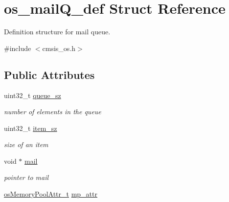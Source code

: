 \hypertarget{structos__mail_q__def}{}\section{os\+\_\+mail\+Q\+\_\+def Struct Reference}
\label{structos__mail_q__def}


Definition structure for mail queue.  




{\ttfamily \#include $<$cmsis\+\_\+os.\+h$>$}

\subsection*{Public Attributes}
\begin{DoxyCompactItemize}
\item 
\mbox{\label{structos__mail_q__def_a2614df3d7904500621666abc01808f22}} 
uint32\+\_\+t \mbox{\hyperlink{structos__mail_q__def_a2614df3d7904500621666abc01808f22}{queue\+\_\+sz}}
\begin{DoxyCompactList}\small\item\em number of elements in the queue \end{DoxyCompactList}\item 
\mbox{\label{structos__mail_q__def_a582330af53f89bd1f2ce4a27c7facb07}} 
uint32\+\_\+t \mbox{\hyperlink{structos__mail_q__def_a582330af53f89bd1f2ce4a27c7facb07}{item\+\_\+sz}}
\begin{DoxyCompactList}\small\item\em size of an item \end{DoxyCompactList}\item 
\mbox{\label{structos__mail_q__def_ac20481b569891bf520d2aa263c65c892}} 
void $\ast$ \mbox{\hyperlink{structos__mail_q__def_ac20481b569891bf520d2aa263c65c892}{mail}}
\begin{DoxyCompactList}\small\item\em pointer to mail \end{DoxyCompactList}\item 
\mbox{\label{structos__mail_q__def_a09357977d1cc71ddcb2496c2e3e58a98}} 
\mbox{\hyperlink{structos_memory_pool_attr__t}{os\+Memory\+Pool\+Attr\+\_\+t}} \mbox{\hyperlink{structos__mail_q__def_a09357977d1cc71ddcb2496c2e3e58a98}{mp\+\_\+attr}}

\end{DoxyCompactItemize}
